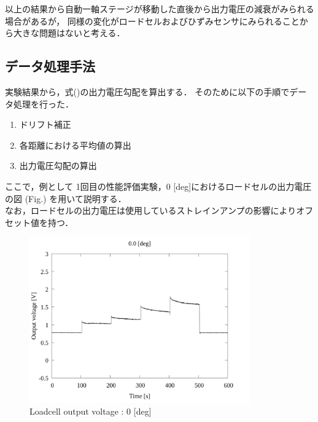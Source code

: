 
\newpage

以上の結果から自動一軸ステージが移動した直後から出力電圧の減衰がみられる場合があるが，
同様の変化がロードセルおよびひずみセンサにみられることから大きな問題はないと考える．

\subsection{データ処理手法}

実験結果から，式()の出力電圧勾配を算出する．
そのために以下の手順でデータ処理を行った．

\begin{enumerate}[(1)]
  \item ドリフト補正
  \item 各距離における平均値の算出
  \item 出力電圧勾配の算出
\end{enumerate}

ここで，例として 1回目の性能評価実験，0 [deg]におけるロードセルの出力電圧の図 (Fig.) を用いて説明する．\\
なお，ロードセルの出力電圧は使用しているストレインアンプの影響によりオフセット値を持つ．

\begin{figure}[htbp]
  \footnotesize
  \begin{center}
    \includegraphics[width=95mm]{../../02_workspace/result/2-1/plot/01-1_loadcell/01_loadcell_0.png}
    \caption{Loadcell output voltage : 0 [deg]}
  \end{center}
\end{figure}

